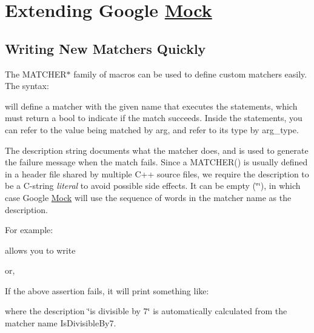 \section*{Extending Google \mbox{\hyperlink{class_mock}{Mock}}}

\subsection*{Writing New Matchers Quickly}

The {\ttfamily M\+A\+T\+C\+H\+E\+R$\ast$} family of macros can be used to define custom matchers easily. The syntax\+:


\begin{DoxyCode}{0}
\end{DoxyCode}


will define a matcher with the given name that executes the statements, which must return a {\ttfamily bool} to indicate if the match succeeds. Inside the statements, you can refer to the value being matched by {\ttfamily arg}, and refer to its type by {\ttfamily arg\+\_\+type}.

The description string documents what the matcher does, and is used to generate the failure message when the match fails. Since a {\ttfamily M\+A\+T\+C\+H\+E\+R()} is usually defined in a header file shared by multiple C++ source files, we require the description to be a C-\/string {\itshape literal} to avoid possible side effects. It can be empty ({\ttfamily \char`\"{}\char`\"{}}), in which case Google \mbox{\hyperlink{class_mock}{Mock}} will use the sequence of words in the matcher name as the description.

For example\+: 
\begin{DoxyCode}{0}
\end{DoxyCode}
 allows you to write 
\begin{DoxyCode}{0}
\end{DoxyCode}
 or, 
\begin{DoxyCode}{0}
\end{DoxyCode}
 If the above assertion fails, it will print something like\+: 
\begin{DoxyCode}{0}
\end{DoxyCode}
 where the description {\ttfamily \char`\"{}is divisible by 7\char`\"{}} is automatically calculated from the matcher name {\ttfamily Is\+Divisible\+By7}.

